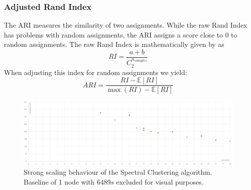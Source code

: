 \subsubsection{Adjusted Rand Index}
The \gls{ARI} measures the similarity of two assignments. While the raw Rand Index has problems with random assignments, the \gls{ARI} assigns a score close to \(0\)
to random assignments.
The raw Rand Index is mathematically given by \cite{noauthor_23_2020} as
\[RI = \frac{a + b}{C_2^{n_{samples}}}\]
When adjusting this index for random assignments we yield:
\[ARI = \frac{RI - \mathbb{E} [RI]}{\max (RI) - \mathbb{E} [RI]}\]


\begin{figure}
  \includegraphics[width=0.9\linewidth]{images/strong_scaling_chart.png}
  \caption{Strong scaling behaviour of the Spectral Clustering algorithm. Baseline of 1 node with \(6489s\) excluded for visual purposes.}\label{fig:strong_scaling}
\end{figure}
